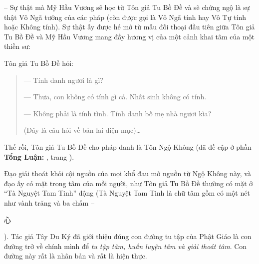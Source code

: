 -- Sự thật mà Mỹ Hầu Vương sẽ học từ Tôn giả Tu Bồ Đề và sẽ chứng ngộ là sự thật Vô Ngã tướng của các pháp (còn được gọi là Vô Ngã tính hay Vô Tự tính hoặc Không tính). Sự thật ấy được hé mở từ mẫu đối thoại đầu tiên giữa Tôn giả Tu Bồ Đề và Mỹ Hầu Vương mang đầy hương vị của một cảnh khai tâm của một thiền sư:

Tôn giả Tu Bồ Đề hỏi:

\begin{quote}
--- Tính danh ngươi là gì?

--- Thưa, con không có tính gì cả. Nhất sinh không có tính.

--- Không phải là tính tình. Tính danh bố mẹ nhà ngươi kìa?

(Đây là câu hỏi về bản lai diện mục)\ldots
\end{quote}

Thế rồi, Tôn giả Tu Bồ Đề cho pháp danh là Tôn Ngộ Không (đã đề cập ở phần {\bf Tổng Luận:} , trang \pageref{sub:ve_ton_ngo_khong}).

Đạo giải thoát khỏi cội nguồn của mọi khổ đau mở nguồn từ Ngộ Không này, và đạo ấy có mặt trong tâm của mỗi người, như Tôn giả Tu Bồ Đề thường có mặt ở ``Tà Nguyệt Tam Tinh'' động (Tà Nguyệt Tam Tinh là chữ tâm gồm có một nét như vành trăng và ba chấm -- \begin{CJK*}{UTF8}{bkai}心\end{CJK*}). Tác giả Tây Du Ký đã giới thiệu đúng con đường tu tập của Phật Giáo là con đường trở về chính mình để \emph{tu tập tâm, huấn luyện tâm và giải thoát tâm}. Con đường này rất là nhân bản và rất là hiện thực.

\hrulefill


